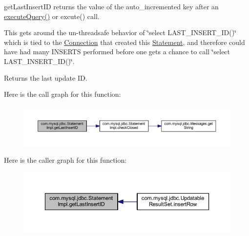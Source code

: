 get\+Last\+Insert\+ID returns the value of the auto\+\_\+incremented key after an \mbox{\hyperlink{classcom_1_1mysql_1_1jdbc_1_1_statement_impl_a0cec26f8a08e9d8e85b10565d4490b1a}{execute\+Query()}} or excute() call.

This gets around the un-\/threadsafe behavior of \char`\"{}select L\+A\+S\+T\+\_\+\+I\+N\+S\+E\+R\+T\+\_\+\+I\+D()\char`\"{} which is tied to the \mbox{\hyperlink{interfacecom_1_1mysql_1_1jdbc_1_1_connection}{Connection}} that created this \mbox{\hyperlink{interfacecom_1_1mysql_1_1jdbc_1_1_statement}{Statement}}, and therefore could have had many I\+N\+S\+E\+R\+TS performed before one gets a chance to call \char`\"{}select L\+A\+S\+T\+\_\+\+I\+N\+S\+E\+R\+T\+\_\+\+I\+D()\char`\"{}. 

\begin{DoxyReturn}{Returns}
the last update ID. 
\end{DoxyReturn}
Here is the call graph for this function\+:
\nopagebreak
\begin{figure}[H]
\begin{center}
\leavevmode
\includegraphics[width=350pt]{classcom_1_1mysql_1_1jdbc_1_1_statement_impl_a0eb045b9ef9a169ee226b5c7b0dd7e05_cgraph}
\end{center}
\end{figure}
Here is the caller graph for this function\+:
\nopagebreak
\begin{figure}[H]
\begin{center}
\leavevmode
\includegraphics[width=350pt]{classcom_1_1mysql_1_1jdbc_1_1_statement_impl_a0eb045b9ef9a169ee226b5c7b0dd7e05_icgraph}
\end{center}
\end{figure}
\mbox{\label{classcom_1_1mysql_1_1jdbc_1_1_statement_impl_ad7895675e6a34d228fd058d2d4bd54cc}} 
